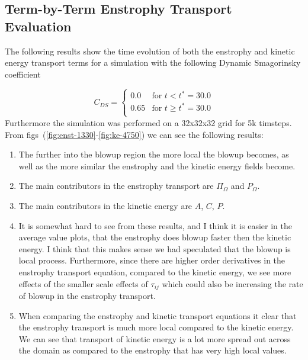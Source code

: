 \newpage
\subsection{Term-by-Term Enstrophy Transport Evaluation}
The following results show the time evolution of both the enstrophy and
kinetic energy transport terms for a simulation with the following Dynamic
Smagorinsky coefficient

\begin{equation}
    C_{DS} = 
    \begin{cases}
        0.0         &   \text{for $t  < t^{\ast} = 30.0$} \\
        0.65        &   \text{for $t \geq t^{\ast} = 30.0 $} \\
    \end{cases}
\end{equation}
Furthermore the simulation was performed on a 32x32x32 grid for 5k timsteps. 
From figs~(\ref{fig:enst-1330}-\ref{fig:ke-4750}) we can see the following
results:
\begin{enumerate}
    \item The further into the blowup region the more local the blowup
        becomes, as well as the more similar the enstrophy and the kinetic
        energy fields become.
        
    \item The main contributors in the enstrophy transport are
        $\Pi_{\Omega}$ and $P_{\Omega}$.

    \item The main contributors in the kinetic energy are $A$, $C$, $P$. 

    \item It is somewhat hard to see from these results, and I think it is
        easier in the average value plots, that the enstrophy does blowup
        faster then the kinetic energy. I think that this makes sense we
        had speculated that the blowup is local process. Furthermore, since
        there are higher order derivatives in the enstrophy transport
        equation, compared to the kinetic energy, we see more effects of
        the smaller scale effects of $\tau_{ij}$ which could also be
        increasing the rate of blowup in the enstrophy transport.

    \item When comparing the enstrophy and kinetic transport equations it
        clear that the enstrophy transport is much more local compared to
        the kinetic energy. We can see that transport of kinetic energy is
        a lot more spread out across the domain as compared to the
        enstrophy that has very high local values.

\end{enumerate}



